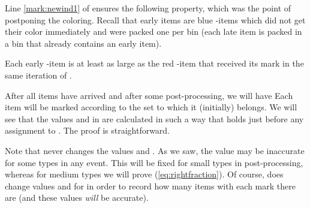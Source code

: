 Line \ref{mark:newind1} of {\MarkItems} ensures the following property, which was the point of postponing the coloring.
Recall that early items are blue -items which did not get their color immediately and were
packed one per bin (each late item is packed in a bin that already contains an early item).

\begin{aproperty}
	\label{prop:first}
	Each early -item is at least as large as the red -item that
	received its mark in the same iteration of \MarkItems.
\end{aproperty}

After all items have arrived and after some post-processing, we will have 
Each item will be marked according to the set to which it (initially) belongs.
We will see that the values  and  in {\MarkItems} are calculated in such a way that
 holds just before any assignment
to .
The proof is straightforward. 

Note that {\MarkItems} never changes the values  and .
As we saw, the value  may be inaccurate for some types in any event.
This will be fixed for small types in post-processing, whereas for medium types we will prove (\ref{eq:rightfraction}).
Of course, {\MarkItems} does change values
 and  for  in order to record how many
items with each mark there are (and these values \emph{will} be accurate).  





